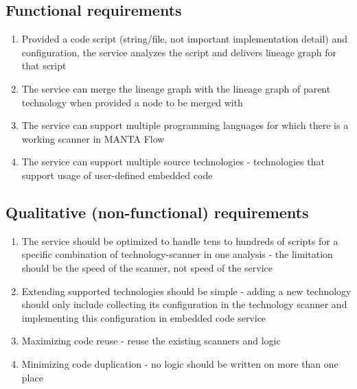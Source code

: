 \subsection{Functional requirements}
\begin{enumerate}
    \item Provided a code script (string/file, not important implementation detail) and configuration, the service analyzes the script and delivers lineage graph for that script
    \item The service can merge the lineage graph with the lineage graph of parent technology when provided a node to be merged with
    \item The service can support multiple programming languages for which there is a working scanner in MANTA Flow
    \item The service can support multiple source technologies - technologies that support usage of user-defined embedded code
\end{enumerate}

\subsection{Qualitative (non-functional) requirements}
\begin{enumerate}
    \item The service should be optimized to handle tens to hundreds of scripts for a specific combination of technology-scanner in one analysis - the limitation should be the speed of the scanner, not speed of the service
    \item Extending supported technologies should be simple - adding a new technology should only include collecting its configuration in the technology scanner and implementing this configuration in embedded code service
    \item Maximizing code reuse - reuse the existing scanners and logic
    \item Minimizing code duplication - no logic should be written on more than one place
\end{enumerate}